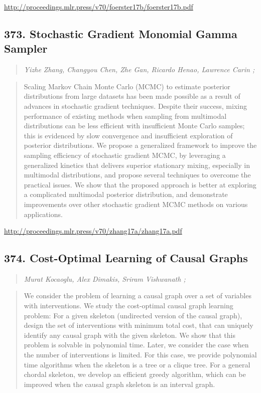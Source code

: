\documentclass{article}
\begin{document}
\href{http://proceedings.mlr.press/v70/foerster17b/foerster17b.pdf}{http://proceedings.mlr.press/v70/foerster17b/foerster17b.pdf}

\subsection{373. Stochastic Gradient Monomial Gamma Sampler}

\begin{quote}
\footnotesize{\textit{Yizhe Zhang, Changyou Chen, Zhe Gan, Ricardo Henao, Lawrence Carin ;}}
\end{quote}

\begin{quote}
    Scaling Markov Chain Monte Carlo (MCMC) to estimate posterior distributions from large datasets has been made possible as a result of advances in stochastic gradient techniques. Despite their success, mixing performance of existing methods when sampling from multimodal distributions can be less efficient with insufficient Monte Carlo samples; this is evidenced by slow convergence and insufficient exploration of posterior distributions. We propose a generalized framework to improve the sampling efficiency of stochastic gradient MCMC, by leveraging a generalized kinetics that delivers superior stationary mixing, especially in multimodal distributions, and propose several techniques to overcome the practical issues. We show that the proposed approach is better at exploring a complicated multimodal posterior distribution, and demonstrate improvements over other stochastic gradient MCMC methods on various applications.  \end{quote}

\href{http://proceedings.mlr.press/v70/zhang17a/zhang17a.pdf}{http://proceedings.mlr.press/v70/zhang17a/zhang17a.pdf}

\subsection{374. Cost-Optimal Learning of Causal Graphs}

\begin{quote}
\footnotesize{\textit{Murat Kocaoglu, Alex Dimakis, Sriram Vishwanath ;}}
\end{quote}

\begin{quote}
    We consider the problem of learning a causal graph over a set of variables with interventions. We study the cost-optimal causal graph learning problem: For a given skeleton (undirected version of the causal graph), design the set of interventions with minimum total cost, that can uniquely identify any causal graph with the given skeleton. We show that this problem is solvable in polynomial time. Later, we consider the case when the number of interventions is limited. For this case, we provide polynomial time algorithms when the skeleton is a tree or a clique tree. For a general chordal skeleton, we develop an efficient greedy algorithm, which can be improved when the causal graph skeleton is an interval graph.  \end{quote}
\end{document}

